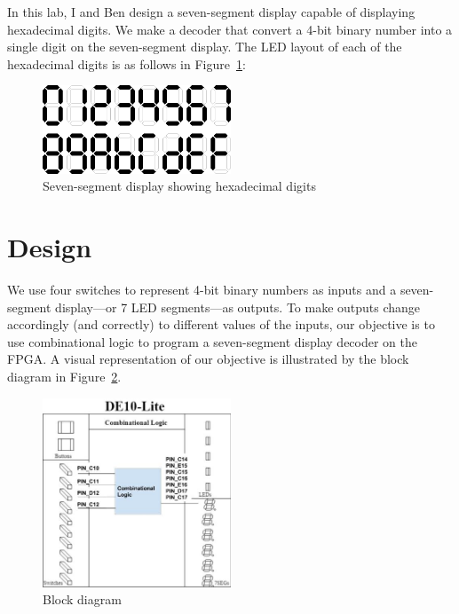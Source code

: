 \documentclass[12pt]{article}
\begin{document}
In this lab, I and Ben design a seven-segment display capable of displaying hexadecimal digits. We make a decoder that convert a 4-bit binary number into a single digit on the seven-segment display. The LED layout of each of the hexadecimal digits is as follows in Figure~\ref{figure:2}:

\begin{figure}[ht]
  \centering
  \includegraphics[width=0.5\textwidth]{seven_segment_hexadecimal.png}
  \caption{Seven-segment display showing hexadecimal digits \cite{EEStackExchangeSevenSegmentHex}}
  \label{figure:2}
\end{figure}

\newpage

\section{Design}

We use four switches to represent 4-bit binary numbers as inputs and a seven-segment display---or 7 LED segments---as outputs. To make outputs change accordingly (and correctly) to different values of the inputs, our objective is to use combinational logic to program a seven-segment display decoder on the FPGA. A visual representation of our objective is illustrated by the block diagram in Figure~\ref{figure:3}.

\begin{figure}[ht]
  \centering
  \includegraphics[width=0.5\textwidth]{lab3_block_diagram.png}
  \caption{Block diagram}
  \label{figure:3}
\end{figure}
\end{document}
